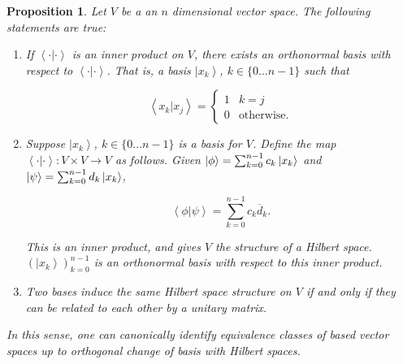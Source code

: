 \documentclass{article}
\newtheorem{proposition}{Proposition}[section]
\theoremstyle{definition}
\numberwithin{figure}{section}
\begin{document}
\begin{proposition}\label{Hilbert properties} Let $V$ be a an $n$ dimensional vector space. The following statements are true:

\begin{enumerate}
\item If $\left<\cdot|\cdot\right>$ is an inner product on $V$, there exists an orthonormal basis with respect to $\left<\cdot|\cdot\right>$. That is, a basis $\left|x_k\right>$, $k\in \{0...n-1\}$ such that

$$\left<x_k|x_j\right>=
\begin{cases}
1 & k=j\\
0 & \text{otherwise}.
\end{cases}$$

\item Suppose $\left|x_k\right>$, $k\in \{0...n-1\}$ is a basis for $V$. Define the map $\left<\cdot|\cdot\right>:V\times V\to V$ as follows. Given $\left|\phi\right>=\sum_{k=0}^{n-1}c_k \left|x_k\right>$ and $\left|\psi\right>=\sum_{k=0}^{n-1}d_k\left|x_k\right>$,

$$\left<\phi|\psi\right>=\sum_{k=0}^{n-1}c_k\overline{d}_k.$$

This is an inner product, and gives $V$ the structure of a Hilbert space. $(\left|x_k\right>)_{k=0}^{n-1}$ is an orthonormal basis with respect to this inner product.

\item Two bases induce the same Hilbert space structure on $V$ if and only if they can be related to each other by a unitary matrix.
\end{enumerate}

In this sense, one can canonically identify equivalence classes of based vector spaces up to orthogonal change of basis with Hilbert spaces.
\end{proposition}
\end{document}

